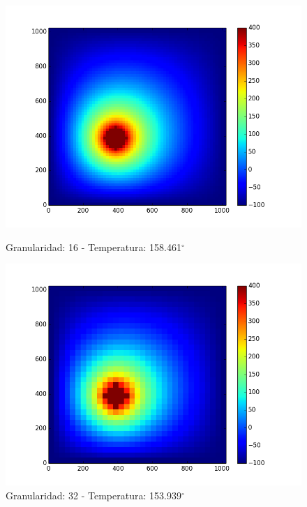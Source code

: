 \begin{figure}[htb]
\begin{center}
\includegraphics[scale=0.3]{imagenes/caso2_16.png} 
\caption{Granularidad: 16 - Temperatura: 158.461$^{\circ}$} 
        \end{center}
\endminipage\hfill
{}
\begin{center}
\includegraphics[scale=0.3]{imagenes/caso2_32.png} 
\caption{Granularidad: 32 - Temperatura: 153.939$^{\circ}$} 
        \end{center}
\endminipage\hfill 
\end{figure}

